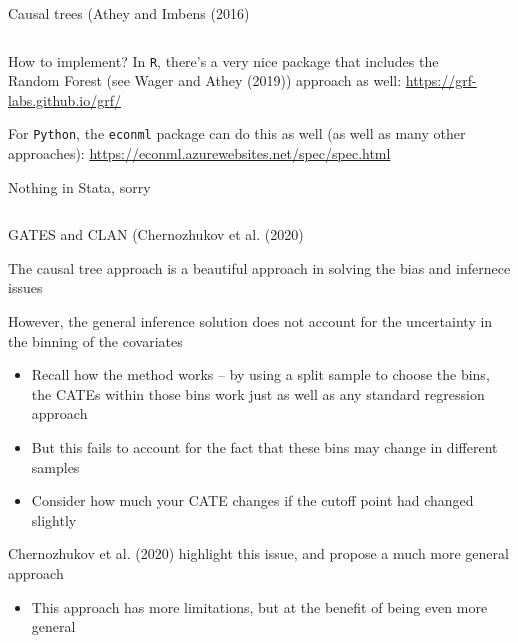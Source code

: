 \documentclass[notes,11pt, aspectratio=169]{beamer}
\newenvironment{wideitemize}{\itemize\addtolength{\itemsep}{10pt}}{\enditemize}
\begin{document}
\begin{frame}{Causal trees (Athey and Imbens (2016)}
    \begin{columns}[onlytextwidth, T] %
      \begin{column}{.5\textwidth}
        \begin{wideitemize}
        \item<1-> How to implement? In \texttt{R}, there's a very nice
          package that includes the Random Forest (see Wager and Athey (2019)) approach as well:
          \url{https://grf-labs.github.io/grf/}
        \item<2-> For \texttt{Python}, the \texttt{econml} package can do
          this as well (as well as many other approaches):
          \url{https://econml.azurewebsites.net/spec/spec.html}
        \item<3-> Nothing in Stata, sorry
        \end{wideitemize}
      \end{column}%
      \hfill%
      \begin{column}{.5\textwidth}
      \end{column}%
    \end{columns}
\end{frame}

\begin{frame}{GATES and CLAN (Chernozhukov et al. (2020)}
  \begin{wideitemize}
  \item The causal tree approach is a beautiful approach in solving
    the bias and infernece issues
  \item However, the general inference solution does not account for
    the uncertainty in the binning of the covariates
    \begin{itemize}
    \item Recall how the method works -- by using a split sample to
      choose the bins, the CATEs within those bins work just as well
      as any standard regression approach
    \item But this fails to account for the fact that these bins may
      change in different samples
    \item Consider how much your CATE changes if the cutoff point had
      changed slightly
    \end{itemize}
  \item Chernozhukov et al. (2020) highlight this issue, and propose a
    much more general approach
    \begin{itemize}
    \item This approach has more limitations, but at the benefit of
      being even more general
    \end{itemize}
  \end{wideitemize}
\end{frame}
\end{document}
